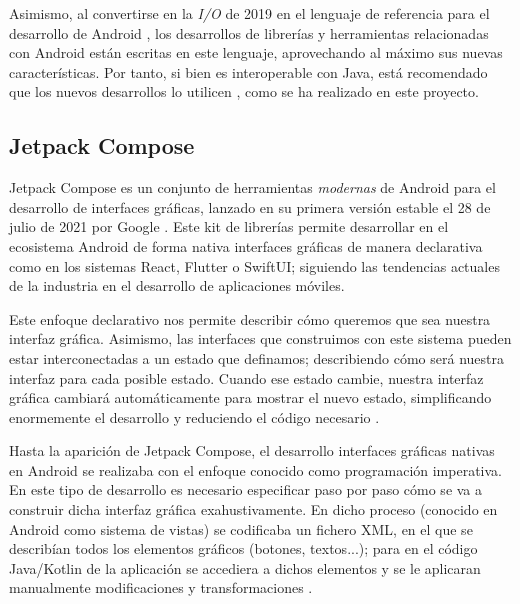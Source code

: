             Asimismo, al convertirse en la \textit{I/O} de 2019 en el lenguaje de referencia para el desarrollo 
            de Android \cite{braun_celebrating_2022}, los desarrollos de librerías y herramientas relacionadas con 
            Android están escritas en este lenguaje, aprovechando al máximo sus nuevas características. Por tanto, si
            bien es interoperable con Java, está recomendado que los nuevos desarrollos lo utilicen 
            \cite{lardinois_kotlin_2019}, como se ha realizado en este proyecto.
            
        \subsection{Jetpack Compose}

            Jetpack Compose es un conjunto de herramientas \textit{modernas} de Android para el desarrollo de 
            interfaces gráficas, lanzado en su primera versión estable el 28 de julio de 2021 por Google
            \cite{bellini_jetpack_2021}. Este kit de librerías permite desarrollar en el ecosistema Android de 
            forma nativa interfaces gráficas de manera declarativa como en los sistemas React, Flutter o SwiftUI;
            siguiendo las tendencias actuales de la industria en el desarrollo de aplicaciones móviles. 

            Este enfoque declarativo nos permite describir cómo queremos que sea nuestra interfaz gráfica. 
            Asimismo, las interfaces que construimos con este sistema pueden estar interconectadas a un estado 
            que definamos; describiendo cómo será nuestra interfaz para cada posible estado. Cuando ese estado cambie, 
            nuestra interfaz gráfica cambiará automáticamente para mostrar el nuevo estado, simplificando enormemente 
            el desarrollo y reduciendo el código necesario \cite{leiva_que_2021}. 

            Hasta la aparición de Jetpack Compose, el desarrollo interfaces gráficas nativas en Android se realizaba 
            con el enfoque conocido como programación imperativa. En este tipo de desarrollo es necesario especificar 
            paso por paso cómo se va a construir dicha interfaz gráfica exahustivamente. En dicho proceso (conocido 
            en Android como sistema de vistas) se codificaba un fichero XML, en el que se describían todos los 
            elementos gráficos (botones, textos...); para en el código Java/Kotlin de la aplicación se accediera 
            a dichos elementos y se le aplicaran manualmente modificaciones y transformaciones 
            \cite{noauthor_programacion_2021}. 

